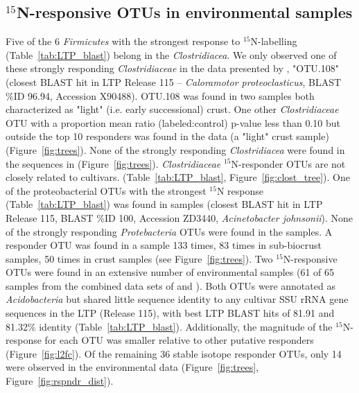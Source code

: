 \subsection{$^{15}$N-responsive OTUs in  environmental samples}
Five of the 6 \textit{Firmicutes} with the strongest response to
$^{15}$N-labelling (Table~\ref{tab:LTP_blast}) belong in the
\textit{Clostridiacea}. We only observed one of these strongly responding
\textit{Clostridiaceae} in the data presented by \citet{Garcia_Pichel_2013},
"OTU.108" (closest BLAST hit in LTP Release 115 -- \textit{Caloramotor
proteoclasticus}, BLAST \%ID 96.94, Accession X90488).  OTU.108 was found in
two samples both characterized as "light" (i.e. early successional) crust. One
other \textit{Clostridiaceae} OTU with a proportion mean ratio
(labeled:control) p-value less than 0.10 but outside the top 10 responders was
found in the \citet{Garcia_Pichel_2013} data (a "light" crust sample)
(Figure~\ref{fig:trees}). None of the strongly responding
\textit{Clostridiacea} were found in the sequences in
\citet{Steven_2013} (Figure~\ref{fig:trees}). \textit{Clostridiaceae}
$^{15}$N-responder OTUs are not closely related to cultivars.
(Table~\ref{tab:LTP_blast}, Figure~\ref{fig:clost_tree}). One of the
proteobacterial OTUs with the strongest $^{15}$N response
(Table~\ref{tab:LTP_blast}) was found in \citet{Garcia_Pichel_2013} samples
(closest BLAST hit in LTP Release 115, BLAST \%ID 100, Accession ZD3440,
\textit{Acinetobacter johnsonii}). None of the strongly responding
\textit{Protebacteria} OTUs were found in the \citet{Steven_2013} samples.
A responder OTU was found in a \citet{Steven_2013} sample 133 times, 83 times
in sub-biocrust samples, 50 times in crust samples (see
Figure~\ref{fig:trees}). Two $^{15}$N-responsive OTUs were found in an
extensive number of environmental samples (61 of 65 samples from the combined
data sets of \citet{Garcia_Pichel_2013} and \citet{Steven_2013}).  Both OTUs
were annotated as \textit{Acidobacteria} but shared little sequence identity to
any cultivar SSU rRNA gene sequences in the LTP (Release 115), with best LTP
BLAST hits of 81.91 and 81.32\% identity (Table~\ref{tab:LTP_blast}).
Additionally, the magnitude of the $^{15}$N-response for each OTU was smaller
relative to other putative responders (Figure~\ref{fig:l2fc}). Of the remaining 36
stable isotope responder OTUs, only 14 were observed in the environmental data
(Figure~\ref{fig:trees}, Figure~\ref{fig:rspndr_dist}).

